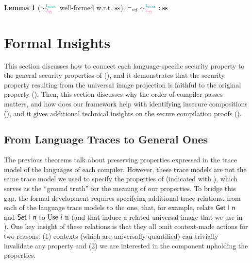 \documentclass[acmsmall]{acmart}
\theoremstyle{definition}
\newtheorem{lemma}{Lemma}[section]
\begin{document}
\begin{lemma}[$\sim^{\Lscct}_{\Lspec}$ well-formed w.r.t. $\operatorname{ss}$]\label{lem:wf:lscctlspec}
  $\wfcsig{\sim^{\Lscct}_{\Lspec}}{\sssafe}$
\end{lemma}












\section{Formal Insights}\label{sec:formalities}

This section discusses how to connect each language-specific security property to the general security properties of  (), and it demonstrates that the security property resulting from the universal image projection is faithful to the original property (). 
% 
Then, this section discusses why the order of compiler passes matters, and how does our framework help with identifying insecure compositions (), and it gives additional technical insights on the secure compilation proofs ().

\subsection{From Language Traces to General Ones}\label{subsec:formalities:maps}

The previous theorems talk about preserving properties expressed in the trace model of the languages of each compiler.
However, these trace models are not the same trace model we used to specify the properties of  (indicated with ), which serves as the ``ground truth'' for the meaning of our properties.
% 
To bridge this gap, the formal development requires specifying additional trace relations, from each of the language trace models to the  one, that, for example, relate $\mathsf{Get\ l\ n}$ and $\mathsf{Set\ l\ n}$ to $\text{Use\ \ensuremath l\ n}$ (and that induce a related universal image that we use in ).
% 
One key insight of these relations is that they all omit context-made actions for two reasons: (1) contexts (which are universally quantified) can trivially invalidate any property and (2) we are interested in the component upholding the properties.
% 
\end{document}
